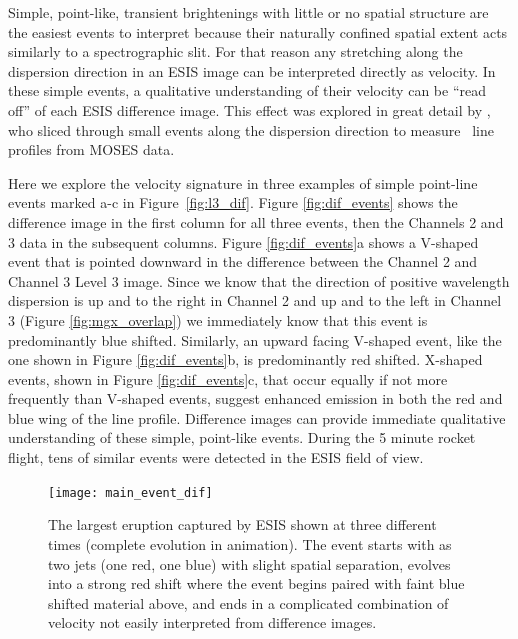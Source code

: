     	Simple, point-like, transient brightenings with little or no spatial structure are the easiest events to interpret because their naturally confined spatial extent acts similarly to a spectrographic slit.
    	For that reason any stretching along the dispersion direction in an ESIS image can be interpreted directly as velocity. 
    	In these simple events, a qualitative understanding of their velocity can be ``read off'' of each ESIS difference image.
    	This effect was explored in great detail by \citet{Rust2019}, who sliced through small events along the dispersion direction to measure \heii \ line profiles from MOSES data.
    	
    	Here we explore the velocity signature in three examples of simple point-line events marked a-c in Figure~\ref{fig:l3_dif}.  
    	Figure \ref{fig:dif_events} shows the difference image in the first column for all three events, then the Channels 2 and 3 data in the subsequent columns. 
    	Figure \ref{fig:dif_events}a shows a V-shaped event that is pointed downward in the difference between the Channel 2 and Channel 3 Level 3 image.
    	Since we know that the direction of positive wavelength dispersion is up and to the right in Channel 2 and up and to the left in Channel 3 (Figure \ref{fig:mgx_overlap}) we immediately know that this event is predominantly blue shifted.  
    	Similarly, an upward facing V-shaped event, like the one shown in Figure \ref{fig:dif_events}b, is predominantly red shifted.
    	X-shaped events, shown in Figure \ref{fig:dif_events}c, that occur equally if not more frequently than V-shaped events, suggest enhanced emission in both the red and blue wing of the line profile.
    	Difference images can provide immediate qualitative understanding of these simple, point-like events.  
    	During the 5 minute rocket flight, tens of similar events were detected in the ESIS field of view.  
    	
    	
    	\begin{figure}[htb!]
    		\texttt{[image: main\_event\_dif]}
    		\centering
    		\caption{The largest eruption captured by ESIS shown at three different times (complete evolution in animation). The event starts with as two jets (one red, one blue) with slight spatial separation, evolves into a strong red shift where the event begins paired with faint blue shifted material above, and ends in a complicated combination of velocity not easily interpreted from difference images. }
    		\label{fig:main_event}
    	\end{figure}
		
